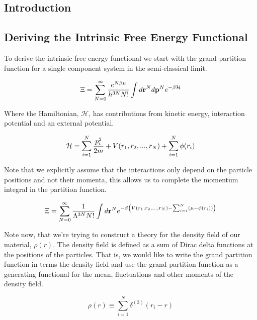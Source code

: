 \subsection{Introduction}

\subsection{Deriving the Intrinsic Free Energy Functional}

To derive the intrinsic free energy functional we start with the grand partition function for a single component system in the semi-classical limit.

\begin{equation}
    \Xi = \sum_{N=0}^\infty \frac{e^{N\beta\mu}}{h^{3N} N!} 
                   \int d\mathbf{r}^Nd\mathbf{p}^N e^{ -\beta \mathcal{H}}  
\end{equation}

Where the Hamiltonian, $\mathcal{H}$, has contributions from kinetic energy, interaction potential and an external potential.

\begin{equation}
    \mathcal{H} = \sum_{i=1}^N \frac{p_i^2}{2m} + V(r_1, r_2, ..., r_N) + \sum_{i=1}^N \phi(r_i)
\end{equation}

Note that we explicitly assume that the interactions only depend on the particle positions and not their momenta, this allows us to complete the momentum integral in the partition function. 

\begin{equation}
    \Xi = \sum_{N=0}^\infty \frac{1}{\Lambda^{3N}N!} 
                   \int d\mathbf{r}^N e^{ -\beta \left(V(r_1, r_2, ...,r_N) - \sum_{i=1}^N(\mu - \phi(r_i))\right)} 
\end{equation}

Note now, that we're trying to construct a theory for the density field of our material, $\rho(r)$. The density field is defined as a sum of Dirac delta functions at the positions of the particles. That is, we would like to write the grand partition function in terms the density field and use the grand partition function as a generating functional for the mean, fluctuations and other moments of the density field.

\begin{equation}
    \rho(r) \equiv \sum_{i=1}^N \delta^{(3)}(r_i - r)
\end{equation}

